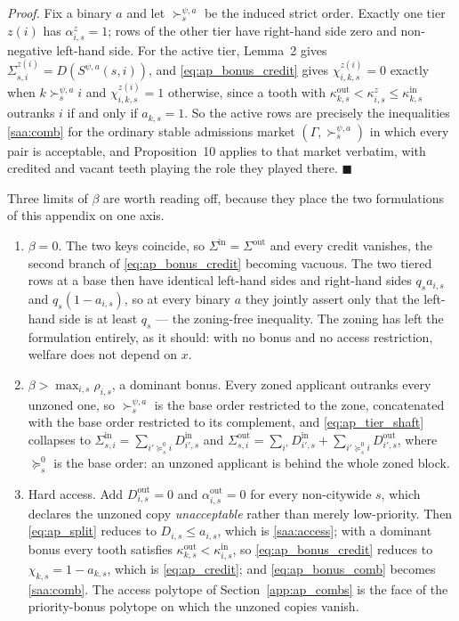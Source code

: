 \documentclass{article}
\begin{document}
\textit{Proof.} Fix a binary $a$ and let $\succ_s^{\psi,a}$ be the induced strict order. Exactly one tier $z(i)$ has $\alpha^{z}_{i,s} = 1$; rows of the other tier have right-hand side zero and non-negative left-hand side. For the active tier, Lemma~2 gives $\Sigma^{z(i)}_{s,i} = D(S^{\psi,a}(s,i))$, and \eqref{eq:ap_bonus_credit} gives $\chi^{z(i)}_{i,k,s} = 0$ exactly when $k \succ_s^{\psi,a} i$ and $\chi^{z(i)}_{i,k,s} = 1$ otherwise, since a tooth with $\kappa^{\mathrm{out}}_{k,s} < \kappa^{z}_{i,s} \le \kappa^{\mathrm{in}}_{k,s}$ outranks $i$ if and only if $a_{k,s} = 1$. So the active rows are precisely the inequalities \eqref{saa:comb} for the ordinary stable admissions market $(\Gamma, \succ_s^{\psi,a})$ in which every pair is acceptable, and Proposition~10 applies to that market verbatim, with credited and vacant teeth playing the role they played there. $\blacksquare$

Three limits of $\beta$ are worth reading off, because they place the two formulations of this appendix on one axis.
\begin{enumerate}
    \item $\beta = 0$. The two keys coincide, so $\Sigma^{\mathrm{in}} = \Sigma^{\mathrm{out}}$ and every credit vanishes, the second branch of \eqref{eq:ap_bonus_credit} becoming vacuous. The two tiered rows at a base then have identical left-hand sides and right-hand sides $q_s a_{i,s}$ and $q_s(1 - a_{i,s})$, so at every binary $a$ they jointly assert only that the left-hand side is at least $q_s$ --- the zoning-free inequality. The zoning has left the formulation entirely, as it should: with no bonus and no access restriction, welfare does not depend on $x$.
    \item $\beta > \max_{i,s} \rho_{i,s}$, a dominant bonus. Every zoned applicant outranks every unzoned one, so $\succ_s^{\psi,a}$ is the base order restricted to the zone, concatenated with the base order restricted to its complement, and \eqref{eq:ap_tier_shaft} collapses to $\Sigma^{\mathrm{in}}_{s,i} = \sum_{i' \succeq^{0}_s i} D^{\mathrm{in}}_{i',s}$ and $\Sigma^{\mathrm{out}}_{s,i} = \sum_{i'} D^{\mathrm{in}}_{i',s} + \sum_{i' \succeq^{0}_s i} D^{\mathrm{out}}_{i',s}$, where $\succeq^{0}_s$ is the base order: an unzoned applicant is behind the whole zoned block.
    \item Hard access. Add $D^{\mathrm{out}}_{i,s} = 0$ and $\alpha^{\mathrm{out}}_{i,s} = 0$ for every non-citywide $s$, which declares the unzoned copy \emph{unacceptable} rather than merely low-priority. Then \eqref{eq:ap_split} reduces to $D_{i,s} \le a_{i,s}$, which is \eqref{saa:access}; with a dominant bonus every tooth satisfies $\kappa^{\mathrm{out}}_{k,s} < \kappa^{\mathrm{in}}_{i,s}$, so \eqref{eq:ap_bonus_credit} reduces to $\chi_{k,s} = 1 - a_{k,s}$, which is \eqref{eq:ap_credit}; and \eqref{eq:ap_bonus_comb} becomes \eqref{saa:comb}. The access polytope of Section~\ref{app:ap_combs} is the face of the priority-bonus polytope on which the unzoned copies vanish.
\end{enumerate}
\end{document}
